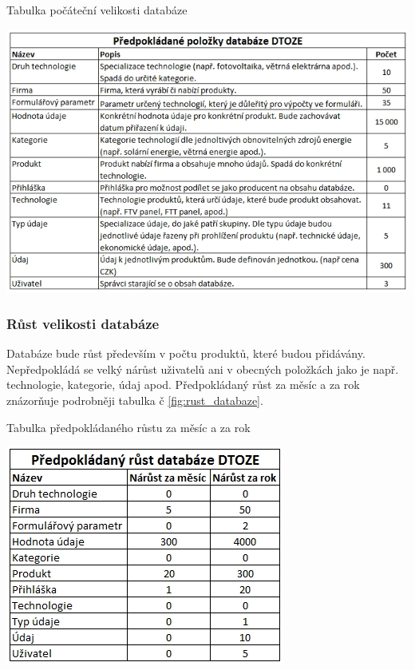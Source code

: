 \documentclass[11pt,a4paper]{article}
\begin{document}
\begin{table}[H] 
\centering 
\caption{Tabulka počáteční velikosti databáze} 
\includegraphics[scale=0.5]{vize_DTOZE_UC_veldata} 
\label{fig:poc_velikost_databaze}
\end{table} 

\subsubsection{Růst velikosti databáze}
Databáze bude růst především v počtu produktů, které budou přidávány. Nepředpokládá se velký nárůst uživatelů ani v obecných položkách jako je např. technologie, kategorie, údaj apod. Předpokládaný růst za měsíc a za rok znázorňuje podrobněji tabulka č \ref{fig:rust_databaze}. 

\begin{table}[H] 
\centering 
\caption{Tabulka předpokládaného růstu za měsíc a za rok} 
\includegraphics[scale=0.5]{vize_DTOZE_UC_veldatapo} 
\label{fig:rust_databaze}
\end{table} 
\end{document}
